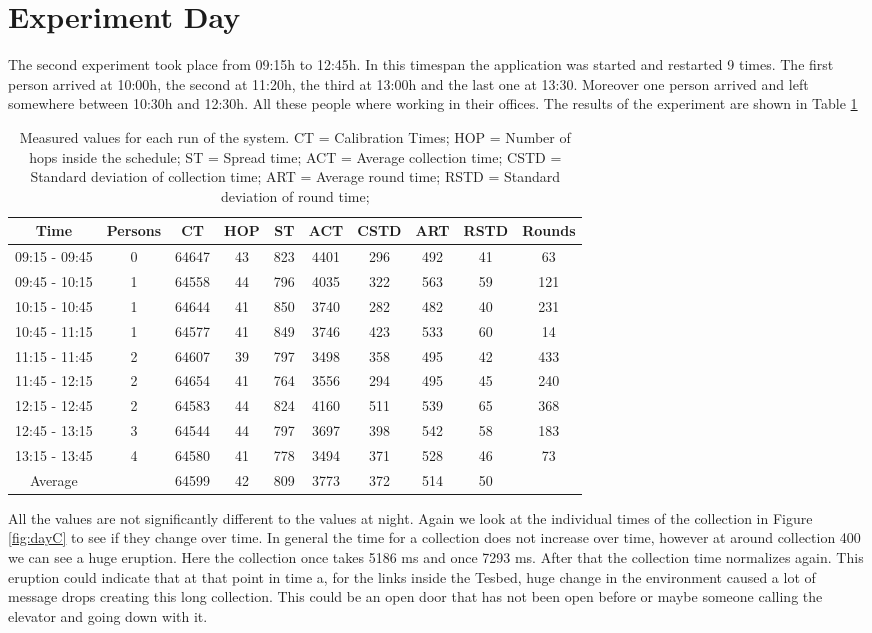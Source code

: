 \section{Experiment Day}
The second experiment took place from 09:15h to 12:45h. In this timespan the application was started and restarted 9 times. The first person arrived at 10:00h, the second at 11:20h, the third at 13:00h and the last one at 13:30. Moreover one person arrived and left somewhere between 10:30h and 12:30h. All these people where working in their offices.
The results of the experiment are shown in Table \ref{tab:DayTable}
\begin{table}[htbp]
 \caption{Measured values for each run of the system. CT = Calibration Times; HOP = Number of hops inside the schedule; ST = Spread time; ACT = Average collection time; CSTD = Standard deviation of collection time; ART = Average round time; RSTD = Standard deviation of round time;}
 \centering
 \begin{tabular}{c|c||c|c|c|c|c|c|c|c}
  Time & Persons & CT & HOP & ST & ACT & CSTD & ART & RSTD & Rounds\\ \toprule
  09:15 - 09:45 & 0 & 64647 & 43 & 823 & 4401 & 296 & 492 & 41 & 63\\ 
  09:45 - 10:15 & 1 & 64558 & 44 & 796 & 4035 & 322 & 563 & 59 & 121\\
  10:15 - 10:45 & 1 & 64644 & 41 & 850 & 3740 & 282 & 482 & 40 & 231\\
  10:45 - 11:15 & 1 & 64577 & 41 & 849 & 3746 & 423 & 533 & 60 & 14\\ 
  11:15 - 11:45 & 2 & 64607 & 39 & 797 & 3498 & 358 & 495 & 42 & 433\\
  11:45 - 12:15 & 2 & 64654 & 41 & 764 & 3556 & 294 & 495 & 45 & 240\\
  12:15 - 12:45 & 2 & 64583 & 44 & 824 & 4160 & 511 & 539 & 65 & 368\\
  12:45 - 13:15 & 3 & 64544 & 44 & 797 & 3697 & 398 & 542 & 58 & 183\\
  13:15 - 13:45 & 4 & 64580 & 41 & 778 & 3494 & 371 & 528 & 46 & 73\\ \toprule
  Average & & 64599 & 42 & 809 & 3773 & 372 & 514 & 50 & \\
 \end{tabular}
 \label{tab:DayTable}
\end{table}

All the values are not significantly different to the values at night. Again we look at the individual times of the collection in Figure \ref{fig:dayC} to see if they change over time. In general the time for a collection does not increase over time, however at around collection 400 we can see a huge eruption. Here the collection once takes 5186 ms and once
7293 ms. After that the collection time normalizes again. This eruption could indicate that at that point in time a, for the links inside the Tesbed, huge change in the environment caused a lot of message drops creating this long collection. This could be an open door that has not been open before or maybe someone calling the elevator and going down with it. 


